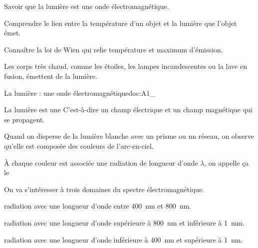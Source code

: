 \tetePremStssLumi



\begin{objectifs}
  \item Savoir que la lumière est une onde électromagnétique.
  \item Comprendre le lien entre la température d'un objet et la lumière que l'objet émet.
  \item Connaître la loi de Wien qui relie température et maximum d'émission.
\end{objectifs}

\begin{contexte}
  Les corps très chaud, comme les étoiles, les lampes incandescentes ou la lave en fusion, émettent de la lumière.
  
\end{contexte}


\begin{doc}{La lumière : une onde électromagnétique}{doc:A1_}
  \begin{encart}
    La lumière est une 
    C'est-à-dire un champ électrique et un champ magnétique qui se propagent.
  \end{encart}

  Quand on disperse de la lumière blanche avec un prisme ou un réseau, on observe qu'elle est composée des couleurs de l'arc-en-ciel.
  \begin{center}
  \end{center}
  \begin{center}
  \end{center}

  À chaque couleur est associée une radiation de longueur d'onde $\lambda$, on appelle ça le 

  \begin{encart}    
    On va s'intéresser à trois domaines du spectre électromagnétique.
    \begin{listePoints}
      \item {} radiation avec une longueur d'onde entre \qty{400}{\nm} et \qty{800}{\nm}.
      \item {} radiation avec une longueur d'onde supérieure à \qty{800}{\nm} et inférieure à \qty{1}{\mm}.
      \item {} radiation avec une longueur d'onde inférieure à \qty{400}{\nm} et supérieure à \qty{1}{\nm}.
    \end{listePoints}
  \end{encart}
\end{doc}

